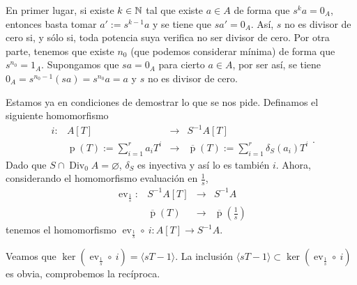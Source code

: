 \documentclass[../main.tex]{subfiles}
\begin{document}
En primer lugar, si existe $k\in\mathbb{N}$ tal que existe $a\in A$ de forma que $s^ka=0_A$, entonces basta tomar $a':=s^{k-1}a$ y se tiene que $sa'=0_A$. Así, $s$ no es divisor de cero si, y sólo si, toda potencia suya verifica no ser divisor de cero. Por otra parte, tenemos que existe $n_0$ (que podemos considerar mínima) de forma que $s^{n_0}=1_A$. Supongamos que $sa=0_A$ para cierto $a\in A$, por ser así, se tiene $0_A=s^{n_0-1}(sa)=s^{n_0}a=a$ y $s$ no es divisor de cero.

Estamos ya en condiciones de demostrar lo que se nos pide. Definamos el siguiente homomorfismo
$$\begin{array}{rrcl}
    i:&A[T]&\longrightarrow&S^{-1}A[T]\\
    &\operatorname{p}(T):=\sum_{i=1}^ra_iT^i&\longrightarrow&\overline{\operatorname{p}}(T):=\sum_{i=1}^r\delta_S(a_i)T^i
\end{array}.$$
Dado que $S\cap\operatorname{Div}_0A=\varnothing$, $\delta_S$ es inyectiva y así lo es también $i$. Ahora, considerando el homomorfismo evaluación en $\frac{1}{s}$,
$$\begin{array}{rrcl}
    \operatorname{ev}_{\frac{1}{s}}:&S^{-1}A[T]&\longrightarrow&S^{-1}A\\
    &\overline{\operatorname{p}}(T)&\longrightarrow&\overline{\operatorname{p}}\left(\frac{1}{s}\right) 
\end{array}$$
tenemos el homomorfismo $\operatorname{ev}_{\frac{1}{s}}\circ\  i:A[T]\longrightarrow S^{-1}A.$

Veamos que $\ker(\operatorname{ev}_{\frac{1}{s}}\circ\  i)=\langle sT-1\rangle.$ La inclusión $\langle sT-1\rangle\subset \ker(\operatorname{ev}_{\frac{1}{s}}\circ\  i)$ es obvia, comprobemos la recíproca.
\end{document}
